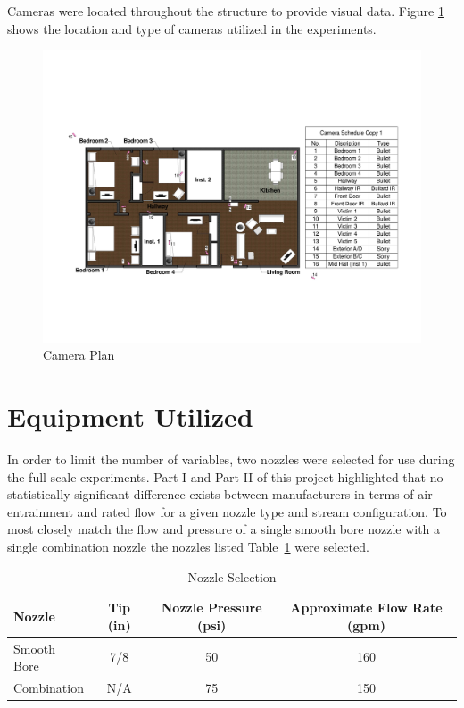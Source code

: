 \documentclass[12pt,oneside]{book}
\begin{document}
Cameras were located throughout the structure to provide visual data. Figure \ref{fig:cameras} shows the location and type of cameras utilized in the experiments.

\begin{figure}[H]
	\includegraphics[width=.75\textheight]{0_Images/Ranch_Pictures/Camera_Plan}
	\caption{Camera Plan}
	\label{fig:cameras}
\end{figure}
\clearpage 

\section{Equipment Utilized}

In order to limit the number of variables, two nozzles were selected for use during the full scale experiments. Part I \cite{Weinchenk_watermapping} and Part II \cite{Weinchenk_airentrainment} of this project highlighted that no statistically significant difference exists between manufacturers in terms of air entrainment and rated flow for a given nozzle type and stream configuration. To most closely match the flow and pressure of a single smooth bore nozzle with a single combination nozzle the nozzles listed Table~\ref{table:nozzle_selection} were selected. 

\begin{table}[H]
\caption{Nozzle Selection}
\centering
\begin{tabular}{|l|c|c|c|}
\hline
Nozzle 		& Tip (in) 	& Nozzle Pressure (psi)	& Approximate Flow Rate (gpm) \\ \hline \hline
Smooth Bore & 	7/8 	& 	50 					& 160 \\ \hline
Combination & 	N/A 	& 	75 					& 150 \\ \hline
\end{tabular}
\label{table:nozzle_selection}
\end{table}
\end{document}
